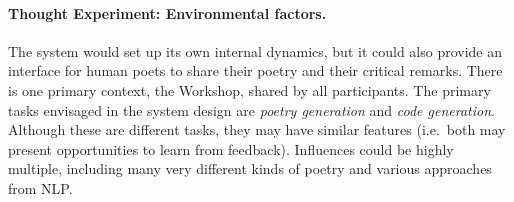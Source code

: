 \paragraph{Thought Experiment: Environmental factors.}
The system would set up its own internal dynamics, but it could also
provide an interface for human poets to share their poetry and their
critical remarks.  There is one primary context, the Workshop, shared
by all participants.  The primary tasks envisaged in the system design
are \emph{poetry generation} and \emph{code generation}.  Although
these are different tasks, they may have similar features (i.e.~both may present opportunities to learn from feedback).
Influences could be highly multiple, including many very different kinds of poetry
and various approaches from NLP.
